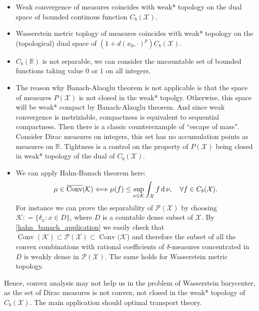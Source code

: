 \begin{rmk}
	\begin{itemize}
		\item Weak convergence of measures coincides with weak* topology on the dual space of bounded continous function $C_b(\mathcal{X})$.
		\item Wasserstein metric toplogy of measures coincides with weak* topology on the (topological) dual space of $(1 + d(x_0, \cdot)^p) C_b(\mathcal{X})$.
		\item $C_b(\mathbb{R})$ is not separable, we can consider the uncountable set of bounded functions taking value $0$ or $1$ on all integers.
		\item The reason why Banach-Alaoglu theorem is not applicable is that the space of measures $P(\mathcal{X})$ is not closed in the weak* topolgy. Otherwise, this space will be weak* compact by Banach-Alaoglu theorem. And since weak convergence is metriziable, compactness is equivalent to sequential compactness. Then there is a classic counterexample of ``escape of mass". Consider Dirac measures on integers, this set has no accumulation points as measures on $\mathbb{R}$. Tightness is a control on the property of $P(\mathcal{X})$ being closed in weak* topology of the dual of $C_b(\mathcal{X})$.
		\item We can apply Hahn-Banach theorem here:
		      \begin{equation}
			      \label{hahn_banach_application}
			      \mu \in \overline { \operatorname { Conv } } ( \mathcal { K } ) \Longleftrightarrow \mu(f) \leq \sup _ { \nu \in \mathcal { K } } \int _ { \mathcal{X} } f \operatorname{d} \nu, \quad \forall f \in C _ { b }( \mathcal{X} ).
		      \end{equation}
		      For instance we can prove the separability of \( \mathscr { P } ( \mathcal{X} ) \) by choosing \( \mathcal { K }: = \{ \delta _ { x }: x \in D \} \), where \( D \) is a countable dense subset of \( \mathcal{X}\). By \cref{hahn_banach_application} we easily check that \( \operatorname { Conv } (\mathcal { K }) \subset \mathscr { P } ( \mathcal{X} ) \subset \overline { \operatorname { Conv } } (\mathcal { K } \)) and therefore the subset of all the convex combinations with rational coefficients of \( \delta \)-measures concentrated in \( D \) is weakly dense in \( \mathscr { P } ( \mathcal{X} ) \). The same holds for Wasserstein metric topology.

	\end{itemize}
\end{rmk}

Hence, convex analysis may not help us in the problem of Wasserstein barycenter, as the set of Dirac measures is not convex, not closed in the weak* topology of $C_b(\mathcal{X})$. The main application should optimal transport theory.

